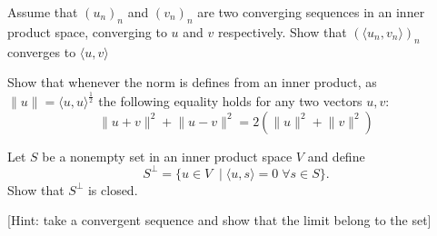 \documentclass[11pt]{article}%
\begin{document}
\begin{Exercise}[title={**$\dagger$}]
	Assume that $(u_n)_n$ and $(v_n)_n$ are two converging sequences in an inner product space, converging to $u$ and $v$ respectively. Show that $(\langle u_n, v_n\rangle)_n$ converges to $\langle u, v\rangle$
\end{Exercise}

\begin{Exercise}[title={**}]
	Show that whenever the norm is defines from an inner product, as $\lVert u \rVert = \langle u,u\rangle^\frac{1}{2}$ the following equality holds for any two vectors $u,v$:
	\[\lVert u+v \rVert^2+\lVert u-v \rVert^2 = 2(\lVert u \rVert^2+\lVert v \rVert^2)\]
\end{Exercise}

\begin{Exercise}[title={*}]
	Let $S$ be a nonempty set in an inner product space $V$ and define
	\[S^\perp = \{u\in V \;\;|\; \langle u,s\rangle=0\;\forall s\in S\}.\]
	Show that $S^\perp$ is closed.
	
	[Hint: take a convergent sequence and show that the limit belong to the set]
\end{Exercise}
\end{document}
